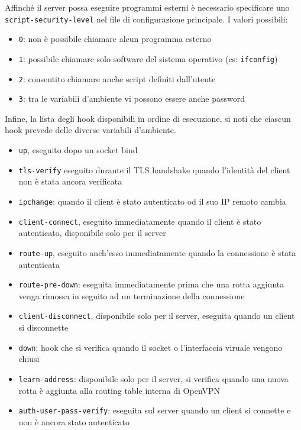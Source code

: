 Affinché il server possa eseguire programmi esterni è necessario specificare uno
\texttt{script-security-level} nel file di configurazione principale. I valori possibili:
\begin{itemize}
	\item \texttt{0}: non è possibile chiamare alcun programma esterno
	\item \texttt{1}: possibile chiamare solo software del sistema operativo (es: \texttt{ifconfig})
	\item \texttt{2}: consentito chiamare anche script definiti dall'utente
	\item \texttt{3}: tra le variabili d'ambiente vi possono essere anche password
\end{itemize}

Infine, la lista degli hook disponibili in ordine di esecuzione, si noti che ciascun hook
prevede delle diverse
variabili d'ambiente.
\begin{itemize}
	\item \texttt{up}, eseguito dopo un socket bind
	\item \texttt{tls-verify} eseguito durante il TLS handshake quando l'identità
	      del client non è stata ancora verificata
	\item \texttt{ipchange}: quando il client è stato autenticato od il suo IP remoto
	      cambia
	\item \texttt{client-connect}, eseguito immediatamente quando il client è stato
	      autenticato, disponibile solo per il server
	\item \texttt{route-up}, eseguito anch'esso immediatamente quando la connessione è stata
	      autenticata
	\item \texttt{route-pre-down}: eseguita immediatamente prima che una rotta aggiunta venga
	      rimossa in seguito ad un terminazione della connessione
	\item \texttt{client-disconnect}, disponibile solo per il server, eseguita quando
	      un client si disconnette
	\item \texttt{down}: hook che si verifica quando il socket o l'interfaccia viruale vengono
	      chiusi
	\item \texttt{learn-address}: disponibile solo per il server, si verifica quando una nuova rotta
	      è aggiunta alla routing table interna di OpenVPN
	\item \texttt{auth-user-pass-verify}: eseguita sul server quando un client si connette
	      e non è ancora stato autenticato
\end{itemize}

